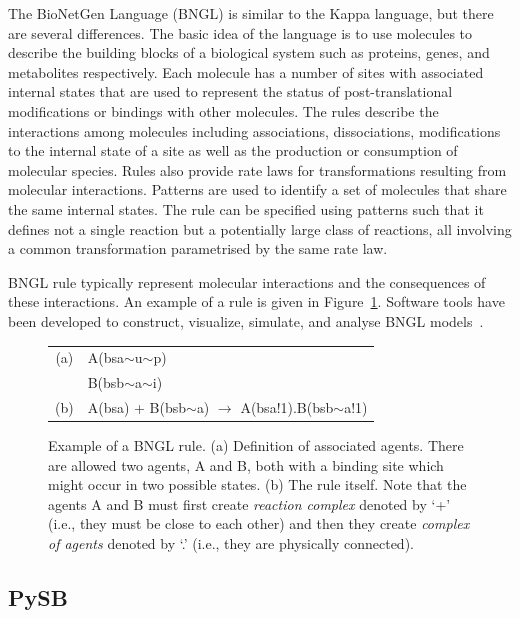 \documentclass[11pt,a4paper]{report}
\begin{document}
The BioNetGen Language (BNGL) \cite{harris2016bionetgen} is similar to the Kappa language, but there are several differences. The basic idea of the language is to use molecules to describe the building blocks of a biological system such as proteins, genes, and metabolites respectively. Each molecule has a number of sites with associated internal states that are used to represent the status of post-translational modifications or bindings with other molecules. The rules describe the interactions among molecules including associa­tions, dissociations, modifications to the internal state of a site
as well as the production or consumption of molecular species. Rules also provide rate laws for transformations resulting from molecular interactions. Patterns are used to identify a set of molecules that share the same internal states. The rule can be specified using patterns such that it defines not a single reaction but a potentially large class of reactions, all involving a common transformation parametrised by the  same rate law.

BNGL rule typically represent molecular interactions and the consequences of these interactions. An example of a rule is given in Figure~\ref{bngl-rule}. Software tools have been developed to construct, visualize, simulate, and analyse BNGL models~\cite{wenskovitch2014mosbie,harris2016bionetgen,xu2011rulebender,sneddon2011efficient}.

\begin{figure}[!h]
\begin{center}
\begin{tabular}{c l}
(a) & A(bsa$\sim$u$\sim$p) \\
  & B(bsb$\sim$a$\sim$i) \\
(b) & A(bsa) + B(bsb$\sim$a) $\rightarrow$ A(bsa!1).B(bsb$\sim$a!1) \\
\end{tabular}
\end{center}
\caption{Example of a BNGL rule. (a) Definition of associated agents. There are allowed two agents, A and B, both with a binding site which might occur in two possible states. (b) The rule itself. Note that the agents A and B must first create \emph{reaction complex} denoted by `+' (i.e., they must be close to each other) and then they create \emph{complex of agents} denoted by `.' (i.e., they are physically connected).}\label{bngl-rule}
\end{figure}

\subsection{PySB}
\end{document}

